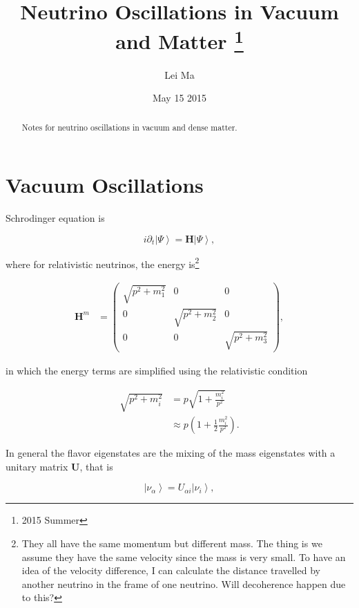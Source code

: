 \documentclass{tufte-handout}
\title{Neutrino Oscillations in Vacuum and Matter \thanks{2015 Summer}}
\author[Lei Ma]{Lei Ma}
\date{May 15 2015}  %
\newcommand{\ket}[1]{\left| #1\right\rangle}
\begin{document}
\maketitle%

\begin{abstract}
\noindent Notes for neutrino oscillations in vacuum and dense matter.
\end{abstract}



\section{Vacuum Oscillations}

Schrodinger equation is

\begin{equation}
i\partial_t \ket{\Psi} = \mathbf H \ket{\Psi},
\end{equation}

where for relativistic neutrinos, the energy is\footnote{They all have the same momentum but different mass. The thing is we assume they have the same velocity since the mass is very small. To have an idea of the velocity difference, I can calculate the distance travelled by another neutrino in the frame of one neutrino. \newline Will decoherence happen due to this? }

\begin{align*}
\mathbf H^m &= \begin{pmatrix}\sqrt{p^2 + m_1^2} & 0 & 0 \\ 0& \sqrt{p^2 + m_2^2} & 0 \\ 0 & 0 & \sqrt{p^2 + m_3^2}  \end{pmatrix},
\end{align*}

in which the energy terms are simplified using the relativistic condition

\begin{align}
\sqrt{p^2+m_i^2} & = p\sqrt{1 + \frac{m_i^2}{p^2}} \\
&\approx  p(1 + \frac{1}{2} \frac{m_i^2}{p^2}).
\end{align}


In general the flavor eigenstates are the mixing of the mass eigenstates with a unitary matrix $\mathbf U$, that is

\begin{equation}
\ket{\nu_{\alpha}} =  U_{\alpha i} \ket{\nu_i},
\end{equation}
\end{document}
